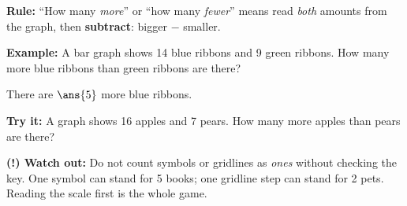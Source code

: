 \documentclass[12pt]{article}
\begin{document}

\begin{formulabox}
\textbf{Rule:} ``How many \emph{more}'' or ``how many \emph{fewer}'' means
read \emph{both} amounts from the graph, then \textbf{subtract}:
bigger $-$ smaller.
\end{formulabox}

\begin{examplebox}
\textbf{Example:} A bar graph shows 14 blue ribbons and 9 green ribbons.
How many more blue ribbons than green ribbons are there?

There are $\ans{5}$ more blue ribbons.
\end{examplebox}

\begin{tryitbox}
\textbf{Try it:} A graph shows 16 apples and 7 pears. How many more apples
than pears are there?\\[2pt]
\end{tryitbox}

\begin{watchoutbox}
\textbf{(!) Watch out:} Do not count symbols or gridlines as \emph{ones}
without checking the key. One symbol can stand for 5 books; one gridline step
can stand for 2 pets. Reading the scale first is the whole game.
\end{watchoutbox}
\end{document}
